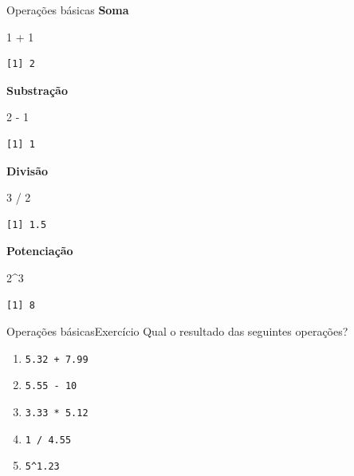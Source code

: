 \documentclass[
  10pt,
  ignorenonframetext,
]{beamer}
\newenvironment{Shaded}{\begin{snugshade}}{\end{snugshade}}
\newcommand{\DecValTok}[1]{\textcolor[rgb]{0.68,0.00,0.00}{#1}}
\newcommand{\SpecialCharTok}[1]{\textcolor[rgb]{0.37,0.37,0.37}{#1}}
\providecommand{\tightlist}{%
  \setlength{\itemsep}{0pt}\setlength{\parskip}{0pt}}\usepackage{longtable,booktabs,array}
\begin{document}
\begin{frame}[fragile]{Operações básicas}
\protect\hypertarget{operauxe7uxf5es-buxe1sicas}{}
\textbf{Soma}

\begin{Shaded}
\begin{Highlighting}[]
\DecValTok{1} \SpecialCharTok{+} \DecValTok{1}
\end{Highlighting}
\end{Shaded}

\begin{verbatim}
[1] 2
\end{verbatim}

\textbf{Substração}

\begin{Shaded}
\begin{Highlighting}[]
\DecValTok{2} \SpecialCharTok{{-}} \DecValTok{1}
\end{Highlighting}
\end{Shaded}

\begin{verbatim}
[1] 1
\end{verbatim}

\textbf{Divisão}

\begin{Shaded}
\begin{Highlighting}[]
\DecValTok{3} \SpecialCharTok{/} \DecValTok{2}
\end{Highlighting}
\end{Shaded}

\begin{verbatim}
[1] 1.5
\end{verbatim}

\textbf{Potenciação}

\begin{Shaded}
\begin{Highlighting}[]
\DecValTok{2}\SpecialCharTok{\^{}}\DecValTok{3}
\end{Highlighting}
\end{Shaded}

\begin{verbatim}
[1] 8
\end{verbatim}
\end{frame}

\begin{frame}[fragile]{Operações básicas\newline Exercício}
\protect\hypertarget{operauxe7uxf5es-buxe1sicasexercuxedcio}{}
Qual o resultado das seguintes operações?

\begin{enumerate}
\tightlist
\item
  \texttt{5.32\ +\ 7.99}
\item
  \texttt{5.55\ -\ 10}
\item
  \texttt{3.33\ *\ 5.12}
\item
  \texttt{1\ /\ 4.55}
\item
  \texttt{5\^{}1.23}
\end{enumerate}
\end{frame}
\end{document}
